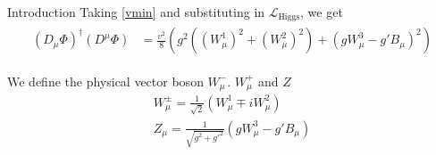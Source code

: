 \begin{chapter}{Introduction}
Taking \ref{vmin} and substituting in $\mathcal{L}_\text{Higgs}$, we get 
\begin{align}\label{W}
\begin{split}
(D_\mu \Phi)^\dagger (D^\mu \Phi)& =\frac{v^2}{8} \left(g^2 ((W^1_\mu)^2 +(W^2_\mu)^2 )+( gW^3_\mu -g'B_\mu)^2 \right)
\end{split}
\end{align}

We define the physical vector boson $W^-_\mu$. $W^+_\mu$ and $Z$ 
\begin{align} 
W^{\pm}_\mu=\frac{1}{\sqrt{2}} (W^1_\mu \mp iW^2_\mu) \label{smo}\\ 
Z_\mu=\frac{1}{\sqrt{g^2+g'^2}}\left(gW^3_\mu -g'B_\mu   \right) \label{zboson}
\end{align}



\end{chapter}
